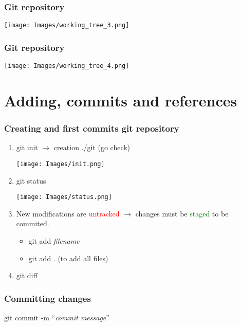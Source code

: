 \documentclass{beamer}
\begin{document}
	\begin{frame}[plain]
		\frametitle{Git repository}

		\begin{center}
			\texttt{[image: Images/working\_tree\_3.png]}
		\end{center}
	\end{frame}	

	\begin{frame}[plain]
		\frametitle{Git repository}

		\begin{center}
			\texttt{[image: Images/working\_tree\_4.png]}
		\end{center}
	\end{frame}	

	\section{Adding, commits and references}

	\begin{frame}[plain]
		\frametitle{Creating and first commits git repository}

		\begin{enumerate}
			\item git init $\rightarrow$ creation ./git (go check)
			\begin{center}
				\texttt{[image: Images/init.png]}
			\end{center}
			\item git status
			\begin{center}
				\texttt{[image: Images/status.png]}
			\end{center}
			\item New modifications are \textcolor{red}{untracked} $\rightarrow$ changes must be \textcolor{green}{staged} to be commited.
			\begin{itemize}
				\item git add \textit{filename} 
				\item git add . (to add all files)
			\end{itemize}
			\item git diff
			
		\end{enumerate}	
	\end{frame}

	\begin{frame}[plain]
		\frametitle{Committing changes}

		\begin{center}
			git commit -m ``\textit{commit message}''
		\end{center}

		\begin{center}
			
		\end{center}
		
	
	\end{frame}
\end{document}
